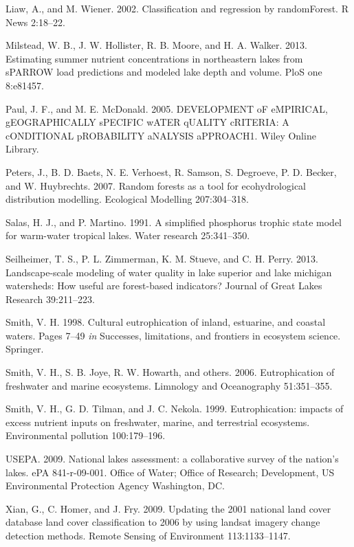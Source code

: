 \documentclass[11pt,]{article}
\begin{document}
Liaw, A., and M. Wiener. 2002. Classification and regression by
randomForest. R News 2:18--22.

Milstead, W. B., J. W. Hollister, R. B. Moore, and H. A. Walker. 2013.
Estimating summer nutrient concentrations in northeastern lakes from
sPARROW load predictions and modeled lake depth and volume. PloS one
8:e81457.

Paul, J. F., and M. E. McDonald. 2005. DEVELOPMENT oF eMPIRICAL,
gEOGRAPHICALLY sPECIFIC wATER qUALITY cRITERIA: A cONDITIONAL
pROBABILITY aNALYSIS aPPROACH1. Wiley Online Library.

Peters, J., B. D. Baets, N. E. Verhoest, R. Samson, S. Degroeve, P. D.
Becker, and W. Huybrechts. 2007. Random forests as a tool for
ecohydrological distribution modelling. Ecological Modelling
207:304--318.

Salas, H. J., and P. Martino. 1991. A simplified phosphorus trophic
state model for warm-water tropical lakes. Water research 25:341--350.

Seilheimer, T. S., P. L. Zimmerman, K. M. Stueve, and C. H. Perry. 2013.
Landscape-scale modeling of water quality in lake superior and lake
michigan watersheds: How useful are forest-based indicators? Journal of
Great Lakes Research 39:211--223.

Smith, V. H. 1998. Cultural eutrophication of inland, estuarine, and
coastal waters. Pages 7--49 \emph{in} Successes, limitations, and
frontiers in ecosystem science. Springer.

Smith, V. H., S. B. Joye, R. W. Howarth, and others. 2006.
Eutrophication of freshwater and marine ecosystems. Limnology and
Oceanography 51:351--355.

Smith, V. H., G. D. Tilman, and J. C. Nekola. 1999. Eutrophication:
impacts of excess nutrient inputs on freshwater, marine, and terrestrial
ecosystems. Environmental pollution 100:179--196.

USEPA. 2009. National lakes assessment: a collaborative survey of the
nation's lakes. ePA 841-r-09-001. Office of Water; Office of Research;
Development, US Environmental Protection Agency Washington, DC.

Xian, G., C. Homer, and J. Fry. 2009. Updating the 2001 national land
cover database land cover classification to 2006 by using landsat
imagery change detection methods. Remote Sensing of Environment
113:1133--1147.
\end{document}
